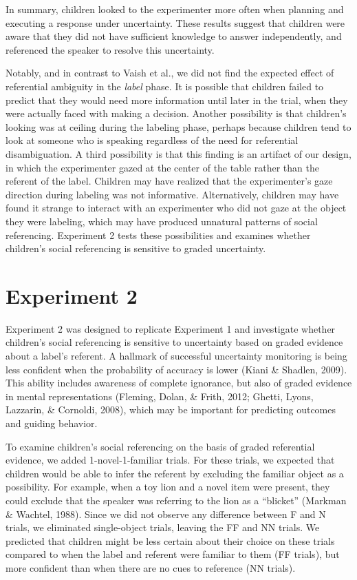 \documentclass[a4paper,man,apacite,floatsintext]{apa6}
\begin{document}
In summary, children looked to the experimenter more often when planning
and executing a response under uncertainty. These results suggest that
children were aware that they did not have sufficient knowledge to
answer independently, and referenced the speaker to resolve this
uncertainty.

Notably, and in contrast to Vaish et al., we did not find the expected
effect of referential ambiguity in the \emph{label} phase. It is
possible that children failed to predict that they would need more
information until later in the trial, when they were actually faced with
making a decision. Another possibility is that children's looking was at
ceiling during the labeling phase, perhaps because children tend to look
at someone who is speaking regardless of the need for referential
disambiguation. A third possibility is that this finding is an artifact
of our design, in which the experimenter gazed at the center of the
table rather than the referent of the label. Children may have realized
that the experimenter's gaze direction during labeling was not
informative. Alternatively, children may have found it strange to
interact with an experimenter who did not gaze at the object they were
labeling, which may have produced unnatural patterns of social
referencing. Experiment 2 tests these possibilities and examines whether
children's social referencing is sensitive to graded uncertainty.

\section{Experiment 2}\label{experiment-2}

Experiment 2 was designed to replicate Experiment 1 and investigate
whether children's social referencing is sensitive to uncertainty based
on graded evidence about a label's referent. A hallmark of successful
uncertainty monitoring is being less confident when the probability of
accuracy is lower (Kiani \& Shadlen, 2009). This ability includes
awareness of complete ignorance, but also of graded evidence in mental
representations (Fleming, Dolan, \& Frith, 2012; Ghetti, Lyons,
Lazzarin, \& Cornoldi, 2008), which may be important for predicting
outcomes and guiding behavior.

To examine children's social referencing on the basis of graded
referential evidence, we added 1-novel-1-familiar trials. For these
trials, we expected that children would be able to infer the referent by
excluding the familiar object as a possibility. For example, when a toy
lion and a novel item were present, they could exclude that the speaker
was referring to the lion as a ``blicket'' (Markman \& Wachtel, 1988).
Since we did not observe any difference between F and N trials, we
eliminated single-object trials, leaving the FF and NN trials. We
predicted that children might be less certain about their choice on
these trials compared to when the label and referent were familiar to
them (FF trials), but more confident than when there are no cues to
reference (NN trials).
\end{document}
